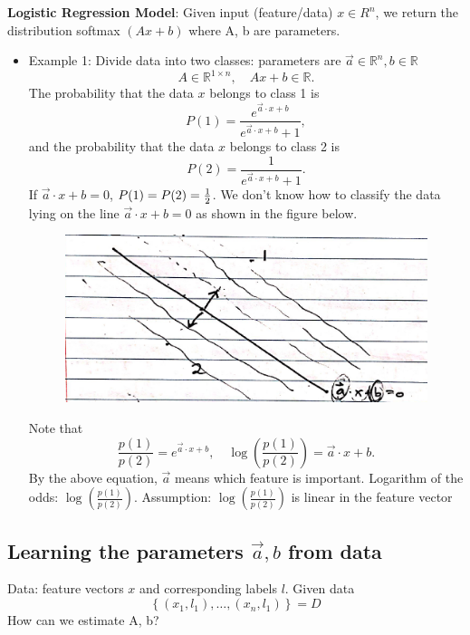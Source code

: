 {\bf Logistic Regression Model}: Given input (feature/data) $x \in R^{n}$, we return the distribution softmax  $\left( Ax+b\right) $ where A, b are parameters.
\begin{itemize}
	\item Example 1: Divide data into two classes: parameters are $\vec{a}\in \mathbb{R}^{n}, b \in \mathbb{R}$ 
	$$
	A\in \mathbb{R}^{1\times n},\quad Ax+b\in \mathbb{R}.
	$$
	The probability that the data $x$ belongs to class 1 is 
	$$
	P(1)=\frac{e^{\vec{a}\cdot x+b}}{e^{\vec{a} \cdot x+b}+1},
	$$
	and the probability that the data $x$ belongs to class 2 is
	$$
	P(2)=\frac{1}{e^{\vec{a} \cdot x+ b}+1}.
	$$
	If $\vec{a} \cdot x+ b=0$, $P(1)=	P(2)={1\over 2}$. We don't know how to classify the data lying on the line $\vec{a} \cdot x+ b=0$ as shown in the figure below.
   \begin{figure}[ht!]
  	\centering
  	\includegraphics[width=.55\textwidth]{../figures/probabilityLR1.png}  
  \end{figure}
  Note that 
$$
\frac{p(1)}{p(2)}=e^{\vec{a} \cdot x+b},\quad \log \left(\frac{p(1)}{p(2)}\right)=\vec{a} \cdot x+b.
$$
By the above equation, $\vec{a}$ means which feature is important.  \newline
Logarithm of the odds: $ \log \left(\frac{p(1)}{p(2)}\right)$. \newline
Assumption:  $\log \left(\frac{p(1)}{p(2)}\right)$ is linear in the feature vector
\end{itemize}


\subsection{Learning the parameters  $\vec{a}, b$ from data }
Data: feature vectors $x$ and corresponding labels $l$. Given data 
$$
\left\{\left(x_{1}, l_{1}\right), \ldots,\left(x_{n}, l_{1}\right)\right\}=D
$$  
How can we estimate A, b? 

